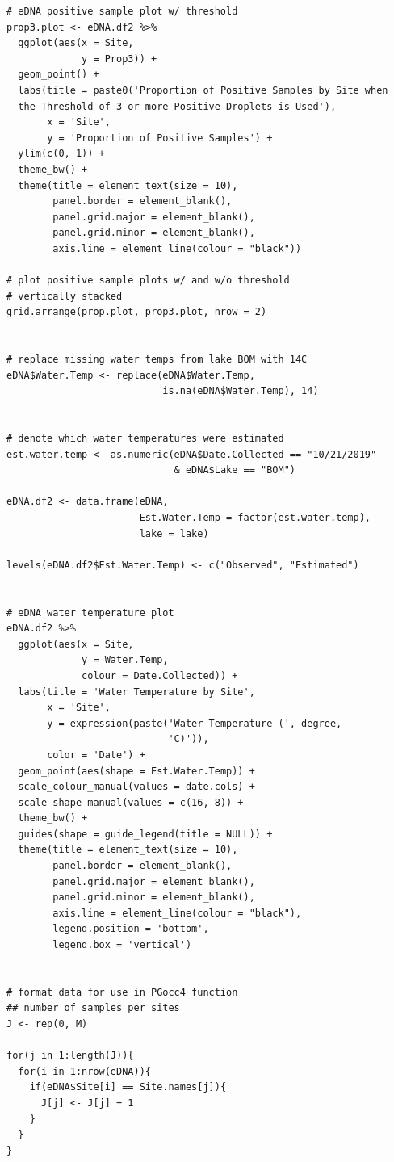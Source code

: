 \documentclass[12pt]{article}\usepackage[]{graphicx}\usepackage[]{color}
\makeatletter
\newenvironment{kframe}{%
 \def\at@end@of@kframe{}%
 \ifinner\ifhmode%
  \def\at@end@of@kframe{\end{minipage}}%
  \begin{minipage}{\columnwidth}%
 \fi\fi%
 \def\FrameCommand##1{\hskip\@totalleftmargin \hskip-\fboxsep
 \colorbox{shadecolor}{##1}\hskip-\fboxsep
     \hskip-\linewidth \hskip-\@totalleftmargin \hskip\columnwidth}%
 \MakeFramed {\advance\hsize-\width
   \@totalleftmargin\z@ \linewidth\hsize
   \@setminipage}}%
 {\par\unskip\endMakeFramed%
 \at@end@of@kframe}
\newenvironment{knitrout}{}{} %
\newenvironment{kframe}{%
 \def\at@end@of@kframe{}%
 \ifinner\ifhmode%
  \def\at@end@of@kframe{\end{minipage}}%
  \begin{minipage}{\columnwidth}%
 \fi\fi%
 \def\FrameCommand##1{\hskip\@totalleftmargin \hskip-\fboxsep
 \colorbox{shadecolor}{##1}\hskip-\fboxsep
     \hskip-\linewidth \hskip-\@totalleftmargin \hskip\columnwidth}%
 \MakeFramed {\advance\hsize-\width
   \@totalleftmargin\z@ \linewidth\hsize
   \@setminipage}}%
 {\par\unskip\endMakeFramed%
 \at@end@of@kframe}
\newenvironment{knitrout}{}{} %
\makeatother
\begin{document}
\begin{small}
\begin{knitrout}
\begin{kframe}
\begin{verbatim}
# eDNA positive sample plot w/ threshold 
prop3.plot <- eDNA.df2 %>% 
  ggplot(aes(x = Site, 
             y = Prop3)) + 
  geom_point() +
  labs(title = paste0('Proportion of Positive Samples by Site when 
  the Threshold of 3 or more Positive Droplets is Used'), 
       x = 'Site', 
       y = 'Proportion of Positive Samples') +
  ylim(c(0, 1)) +
  theme_bw() + 
  theme(title = element_text(size = 10),
        panel.border = element_blank(), 
        panel.grid.major = element_blank(),
        panel.grid.minor = element_blank(), 
        axis.line = element_line(colour = "black"))

# plot positive sample plots w/ and w/o threshold 
# vertically stacked
grid.arrange(prop.plot, prop3.plot, nrow = 2)


# replace missing water temps from lake BOM with 14C
eDNA$Water.Temp <- replace(eDNA$Water.Temp, 
                           is.na(eDNA$Water.Temp), 14)


# denote which water temperatures were estimated
est.water.temp <- as.numeric(eDNA$Date.Collected == "10/21/2019" 
                             & eDNA$Lake == "BOM")

eDNA.df2 <- data.frame(eDNA, 
                       Est.Water.Temp = factor(est.water.temp), 
                       lake = lake)

levels(eDNA.df2$Est.Water.Temp) <- c("Observed", "Estimated")


# eDNA water temperature plot
eDNA.df2 %>% 
  ggplot(aes(x = Site, 
             y = Water.Temp, 
             colour = Date.Collected)) + 
  labs(title = 'Water Temperature by Site', 
       x = 'Site', 
       y = expression(paste('Water Temperature (', degree,
                            'C)')), 
       color = 'Date') +
  geom_point(aes(shape = Est.Water.Temp)) + 
  scale_colour_manual(values = date.cols) + 
  scale_shape_manual(values = c(16, 8)) + 
  theme_bw() +
  guides(shape = guide_legend(title = NULL)) + 
  theme(title = element_text(size = 10),
        panel.border = element_blank(), 
        panel.grid.major = element_blank(),
        panel.grid.minor = element_blank(), 
        axis.line = element_line(colour = "black"), 
        legend.position = 'bottom', 
        legend.box = 'vertical')


# format data for use in PGocc4 function
## number of samples per sites
J <- rep(0, M)

for(j in 1:length(J)){
  for(i in 1:nrow(eDNA)){
    if(eDNA$Site[i] == Site.names[j]){
      J[j] <- J[j] + 1
    }
  }
}



\end{verbatim}
\end{kframe}
\end{knitrout}
\end{small}
\end{document}
